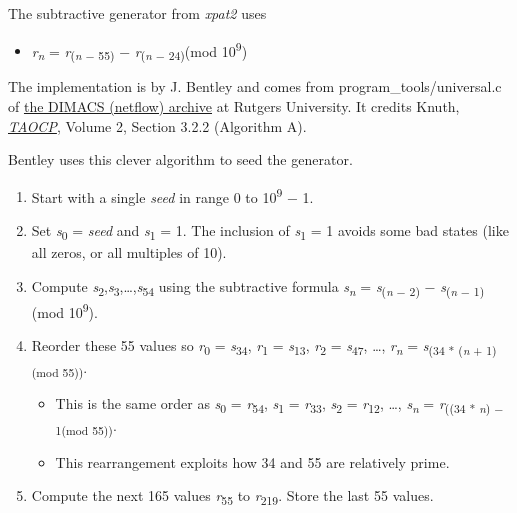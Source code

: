 \begin{itemize}
The subtractive generator from \emph{xpat2} uses

\begin{itemize}
\item
  \emph{r}\textsubscript{\emph{n}} = \emph{r}\textsubscript{(\emph{n} −
  55)} − \emph{r}\textsubscript{(\emph{n} − 24)}(mod
  10\textsuperscript{9})
\end{itemize}

The implementation is by J. Bentley and comes from
program\_tools/universal.c of
\href{ftp://dimacs.rutgers.edu/pub/netflow/}{the DIMACS (netflow)
archive} at Rutgers University. It credits Knuth,
\href{http://en.wikipedia.org/wiki/The\_Art\_of\_Computer\_Programming}{\emph{TAOCP}},
Volume 2, Section 3.2.2 (Algorithm A).

\pagebreak{}
Bentley uses this clever algorithm to seed the generator.

\begin{enumerate}
\item
  Start with a single \emph{s}\emph{e}\emph{e}\emph{d} in range 0 to
  10\textsuperscript{9} − 1.
\item
  Set \emph{s}\textsubscript{0} = \emph{s}\emph{e}\emph{e}\emph{d} and
  \emph{s}\textsubscript{1} = 1. The inclusion of
  \emph{s}\textsubscript{1} = 1 avoids some bad states (like all zeros,
  or all multiples of 10).
\item
  Compute
  \emph{s}\textsubscript{2},\emph{s}\textsubscript{3},\ldots{},\emph{s}\textsubscript{54}
  using the subtractive formula \emph{s}\textsubscript{\emph{n}} =
  \emph{s}\textsubscript{(\emph{n} − 2)} −
  \emph{s}\textsubscript{(\emph{n} − 1)}(mod 10\textsuperscript{9}).
\item
  Reorder these 55 values so \emph{r}\textsubscript{0} =
  \emph{s}\textsubscript{34}, \emph{r}\textsubscript{1} =
  \emph{s}\textsubscript{13}, \emph{r}\textsubscript{2} =
  \emph{s}\textsubscript{47}, \ldots{}, \emph{r}\textsubscript{\emph{n}}
  = \emph{s}\textsubscript{(34 * (\emph{n} + 1)(mod 55))}.

  \begin{itemize}
  \item
    This is the same order as \emph{s}\textsubscript{0} =
    \emph{r}\textsubscript{54}, \emph{s}\textsubscript{1} =
    \emph{r}\textsubscript{33}, \emph{s}\textsubscript{2} =
    \emph{r}\textsubscript{12}, \ldots{},
    \emph{s}\textsubscript{\emph{n}} = \emph{r}\textsubscript{((34 *
    \emph{n}) − 1(mod 55))}.
  \item
    This rearrangement exploits how 34 and 55 are relatively prime.
  \end{itemize}
\item
  Compute the next 165 values \emph{r}\textsubscript{55} to
  \emph{r}\textsubscript{219}. Store the last 55 values.
\end{enumerate}


\end{itemize}

